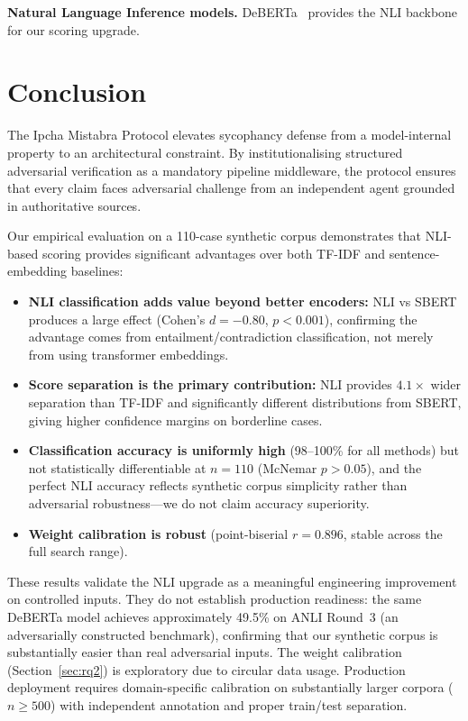 \documentclass[11pt,a4paper]{article}
\begin{document}
\textbf{Natural Language Inference models.}
DeBERTa~\cite{he2021deberta} provides the NLI backbone for our
scoring upgrade.

\section{Conclusion}\label{sec:conclusion}

The Ipcha Mistabra Protocol elevates sycophancy defense from a
model-internal property to an architectural constraint.  By
institutionalising structured adversarial verification as a mandatory
pipeline middleware, the protocol ensures that every claim faces
adversarial challenge from an independent agent grounded in
authoritative sources.

Our empirical evaluation on a 110-case synthetic corpus demonstrates
that NLI-based scoring provides significant advantages over both
TF-IDF and sentence-embedding baselines:

\begin{itemize}[leftmargin=*]
  \item \textbf{NLI classification adds value beyond better
        encoders:} NLI vs SBERT produces a large effect (Cohen's
        $d = -0.80$, $p < 0.001$), confirming the advantage comes
        from entailment/contradiction classification, not merely from
        using transformer embeddings.
  \item \textbf{Score separation is the primary contribution:} NLI
        provides $4.1\times$ wider separation than TF-IDF and
        significantly different distributions from SBERT, giving
        higher confidence margins on borderline cases.
  \item \textbf{Classification accuracy is uniformly high}
        (98--100\% for all methods) but not statistically
        differentiable at $n=110$ (McNemar $p > 0.05$), and the
        perfect NLI accuracy reflects synthetic corpus simplicity
        rather than adversarial robustness---we do not claim accuracy
        superiority.
  \item \textbf{Weight calibration is robust} (point-biserial
        $r = 0.896$, stable across the full search range).
\end{itemize}

These results validate the NLI upgrade as a meaningful engineering
improvement on controlled inputs.  They do not establish production
readiness: the same DeBERTa model achieves approximately 49.5\% on
ANLI Round~3 (an adversarially constructed benchmark), confirming
that our synthetic corpus is substantially easier than real
adversarial inputs.  The weight calibration (Section~\ref{sec:rq2})
is exploratory due to circular data usage.  Production deployment
requires domain-specific calibration on substantially larger corpora
($n \geq 500$) with independent annotation and proper train/test
separation.
\end{document}
